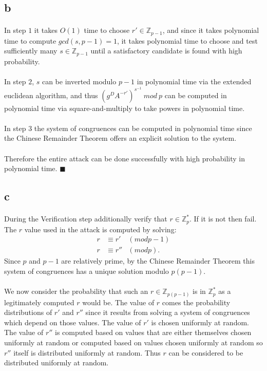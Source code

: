 \documentclass[letterpaper,12pt,oneside,onecolumn]{report}
\begin{document}
\subsection*{b}
\paragraph{}
In step $1$ it takes $O(1)$ time to choose $r' \in \mathbb{Z}_{p-1}$, and since it takes polynomial time to compute $gcd(s,p-1) = 1$, it takes polynomial time to choose and test sufficiently many $s \in \mathbb{Z}_{p-1}$ until a satisfactory candidate is found with high probability.
\paragraph{}
In step $2$, $s$ can be inverted modulo $p-1$ in polynomial time via the extended euclidean algorithm, and thus $(g^DA^{-r'})^{s^{-1}}\ mod\ p$ can be computed in polynomial time via square-and-multiply to take powers in polynomial time.
\paragraph{}
In step $3$ the system of congruences can be computed in polynomial time since the Chinese Remainder Theorem offers an explicit solution to the system.
\paragraph{}
Therefore the entire attack can be done successfully with high probability in polynomial time. $\blacksquare$
\subsection*{c}
\paragraph{}
During the Verification step additionally verify that $r \in \mathbb{Z}_p^*$. If it is not then fail. The $r$ value used in the attack is computed by solving:
\begin{align*}
r &\equiv r' &(mod p-1)\\
r &\equiv r'' &(mod p).
\end{align*}
Since $p$ and $p-1$ are relatively prime, by the Chinese Remainder Theorem this system of congruences has a unique solution modulo $p(p-1)$.
\paragraph{}
We now consider the probability that such an $r \in \mathbb{Z}_{p(p-1)}$ is in $\mathbb{Z}_p^*$ as a legitimately computed $r$ would be. The value of $r$ comes the probability distributions of $r'$ and $r''$ since it results from solving a system of congruences which depend on those values. The value of $r'$ is chosen uniformly at random. The value of $r''$ is computed based on values that are either themselves chosen uniformly at random or computed based on values chosen uniformly at random so $r''$ itself is distributed uniformly at random. Thus $r$ can be considered to be distributed uniformly at random.
\end{document}
